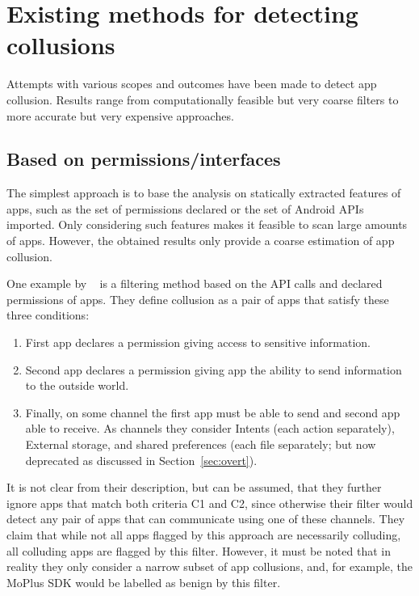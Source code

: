 \documentclass[article, oneside]{aaltoseries}
\newcommand{\Sref}[1]{Section~\ref{#1}}
\begin{document}
\section{Existing methods for detecting collusions}
\label{sec:approaches}

Attempts with various scopes and outcomes have been made to detect app collusion. Results range from computationally feasible but very coarse filters to more accurate but very expensive approaches.

\subsection{Based on permissions/interfaces}
\label{sec:filter}

The simplest approach is to base the analysis on statically extracted features of apps, such as the set of permissions declared or the set of Android APIs imported. Only considering such features makes it feasible to scan large amounts of apps. However, the obtained results only provide a coarse estimation of app collusion.

One example by \citeauthor{Asavoae2016}~\cite{Asavoae2016} is a filtering method based on the API calls and declared permissions of apps. They define collusion as a pair of apps that satisfy these three conditions:
\begin{enumerate}[label={C\arabic*}]
	\item First app declares a permission giving access to sensitive information.
	\item Second app declares a permission giving app the ability to send information to the outside world.
	\item Finally, on some channel the first app must be able to send and second app able to receive. As channels they consider Intents (each action separately), External storage, and shared preferences (each file separately; but now deprecated as discussed in \Sref{sec:overt}).
\end{enumerate}
It is not clear from their description, but can be assumed, that they further ignore apps that match both criteria C1 and C2, since otherwise their filter would detect any pair of apps that can communicate using one of these channels. They claim that while not all apps flagged by this approach are necessarily colluding, all colluding apps are flagged by this filter. However, it must be noted that in reality they only consider a narrow subset of app collusions, and, for example, the MoPlus SDK would be labelled as benign by this filter.
\end{document}
